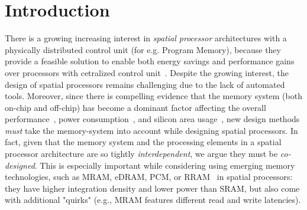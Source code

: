 \section{Introduction}
There is a growing increasing interest in \emph{spatial processor} architectures with a physically distributed control unit (for e.g. Program Memory), because they provide a feasible solution to enable both energy savings and performance gains over processors with cetralized control unit~\cite{7284058,8686088}. %
Despite the growing interest, the design of spatial processors remains challenging due to the lack of automated tools. Moreover, since there is compelling evidence that the memory system (both on-chip and off-chip) has become a dominant factor affecting the overall performance~\cite{williams2009roofline}, power consumption~\cite{dayarathna2015data}, and silicon area usage~\cite{oh2009analytical}, new design methods \textit{must} take the memory-system into account while designing spatial processors.
In fact, given that the memory system and the processing elements in a spatial processor architecture are so tightly \textit{interdependent}, we argue they must be \textit{co-designed}. This is especially important while considering using emerging memory technologies, such as MRAM, eDRAM, PCM, or RRAM~\cite{mem2016} in spatial processors: they have higher integration density and lower power than SRAM, but also come with additional "quirks" (e.g., MRAM features different read and write latencies).

%

